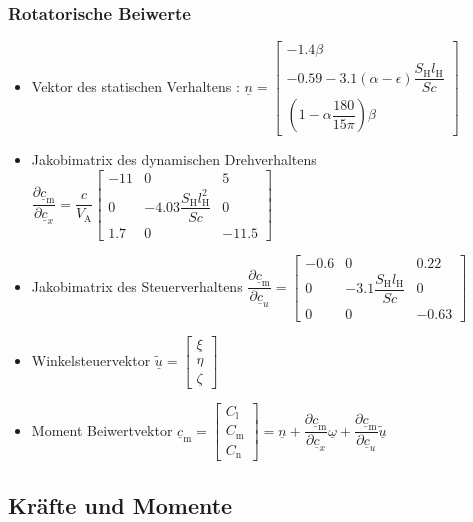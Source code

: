\documentclass[10pt,a4paper]{article}
\begin{document}
\subsubsection{Rotatorische Beiwerte }
\begin{itemize}
\item Vektor des statischen Verhaltens : $\underline{n} = \begin{bmatrix} 
-1.4\beta \\
-0.59 -3.1(\alpha-\epsilon)\dfrac{S_\mathrm{H}l_\mathrm{H}}{Sc} \\
(1 - \alpha\dfrac{180}{15\pi})\beta
\end{bmatrix} $ 
\\
\item Jakobimatrix des dynamischen Drehverhaltens $\dfrac{\partial  \underline{c}_\mathrm{m}}{\partial  \underline{c}_x} = \dfrac{c}{V_\mathrm{A}}\begin{bmatrix} 
-11 & 0 & 5 \\
0 &-4.03\dfrac{S_\mathrm{H}l_\mathrm{H}^2}{Sc}&0 \\
1.7 & 0 & -11.5
\end{bmatrix} $  
\\
\item Jakobimatrix des Steuerverhaltens $\dfrac{\partial  \underline{c}_\mathrm{m}}{\partial  \underline{c}_u} = \begin{bmatrix} 
-0.6 & 0 & 0.22 \\
0 &-3.1\dfrac{S_\mathrm{H}l_\mathrm{H}}{Sc}&0 \\
0 & 0 & -0.63
\end{bmatrix} $  
\item Winkelsteuervektor $\tilde{\underline{u}} = \begin{bmatrix} 
\xi\\
\eta\\
\zeta
\end{bmatrix} $  
\item Moment Beiwertvektor $ \underline{c}_\mathrm{m}  = \begin{bmatrix} 
C_\mathrm{l}\\
C_\mathrm{m}\\
C_\mathrm{n}
\end{bmatrix}=\underline{n} + \dfrac{\partial  \underline{c}_\mathrm{m}}{\partial  \underline{c}_x} \underline{\omega} + \dfrac{\partial  \underline{c}_\mathrm{m}}{\partial  \underline{c}_u} \tilde{\underline{u}}  $
\end{itemize}
\subsection{Kräfte und Momente}
\end{document}

